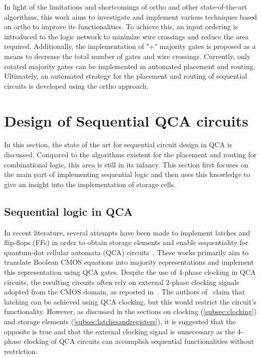 In light of the limitations and shortcomings of ortho and other state-of-the-art algorithms, this work aims to investigate and implement various techniques based on ortho to improve its functionalities. To achieve this, an input ordering is introduced to the logic network to minimize wire crossings and reduce the area required. Additionally, the implementation of "+" majority gates is proposed as a means to decrease the total number of gates and wire crossings. Currently, only rotated majority gates can be implemented in automated placement and routing. Ultimately, an automated strategy for the placement and routing of sequential circuits is developed using the ortho approach.

\section{Design of Sequential QCA circuits}
In this section, the state of the art for sequential circuit design in QCA is discussed. Compared to the algorithms existent for the placement and routing for combinational logic, this area is still in its infancy. This section first focuses on the main part of implementing sequential logic and then uses this knowledge to give an insight into the implementation of storage cells. 

\subsection{Sequential logic in QCA}
In recent literature, several attempts have been made to implement latches and flip-flops (FFs) in order to obtain storage elements and enable sequentiality for quantum-dot cellular automata (QCA) circuits~\cite{sequential_cell_one, sequential_cell_two, dual_edge_triggered_FF_cell, sequential_reversible_cell}. These works primarily aim to translate Boolean CMOS equations into majority representations and implement this representation using QCA gates. Despite the use of 4-phase clocking in QCA circuits, the resulting circuits often rely on external 2-phase clocking signals adopted from the CMOS domain, as reported in~\cite{sequential_cell_one}. The authors of~\cite{sequential_cell_two} claim that latching can be achieved using QCA clocking, but this would restrict the circuit's functionality. However, as discussed in the sections on clocking (\ref{subsec:clocking}) and storage elements (\ref{subsec:latchesandregisters}), it is suggested that the opposite is true and that the external clocking signal is unnecessary as the 4-phase clocking of QCA circuits can accomplish sequential functionalities without restriction.

